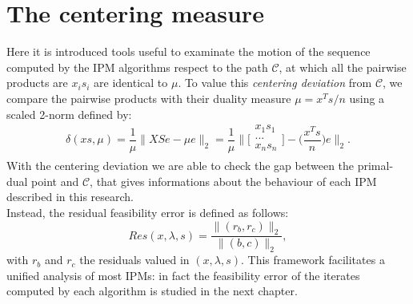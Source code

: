 \documentclass[a4paper,10 pt,titlepage,twoside]{book}
\theoremstyle{plain}
\theoremstyle{definition}
\theoremstyle{remark}
\begin{document}
\section*{The centering measure}
Here it is introduced tools useful to examinate the motion of the sequence computed by the IPM algorithms respect to the path $\mathcal{C}$, at which all the pairwise products are $x_{i}s_{i}$ are identical to $\mu$. To value this \textit{centering deviation} from $\mathcal{C}$, we compare the pairwise products with their duality measure $\mu = x^{T}s/n$ using a scaled 2-norm defined by: 
\begin{equation}\label{cendev}
\delta(xs, \mu)=\frac{1}{\mu}\lVert XSe - \mu e \rVert_{2}=\frac{1}{\mu} \Bigg\lVert\Bigg[\begin{array}{c}
x_{1}s_{1}\\
...\\
x_{n}s_{n}\\
\end{array}
\Bigg]-\Bigg(\frac{x^{T}s}{n}\Bigg)e\Bigg\rVert_{2}.
\end{equation}
With the centering deviation we are able to check the gap between the primal-dual point and $\mathcal{C}$, that gives informations about the behaviour of each IPM described in this research.\\  
Instead, the residual feasibility error is defined as follows:
\begin{equation*}
Res(x,\lambda,s)=\frac{\lVert (r_{b},r_{c})\rVert_{2}}{\lVert (b,c) \rVert_{2}},
\end{equation*} 
 with $r_{b}$ and $r_{c}$ the residuals valued in $(x,\lambda,s)$. This framework facilitates a unified analysis of most IPMs: in fact the feasibility error of the iterates computed by each algorithm is studied in the next chapter.
\end{document}
